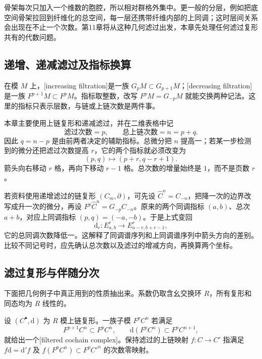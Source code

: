 \ProseParagraphBreak

骨架每次只加入一个维数的胞腔，所以相对群格外集中。更一般的分层，例如把底空间骨架拉回到纤维化的总空间，每一层还携带纤维内部的上同调；这时层间关系会出现在不止一个次数。第11章将从这种几何滤过出发，本章先处理任何滤过复形共有的代数问题。

\subsection{递增、递减滤过及指标换算}
\label{g2:subsec:1001:02}

在模 \(M\) 上，[increasing filtration]是一族 \(G_pM\subset G_{p+1}M\)；[decreasing filtration]是一族 \(F^{p+1}M\subset F^pM\)。指标取整数，改写 \(F^pM=G_{-p}M\) 就能交换两种记法。这里的指标只表示层数，与链或上链次数是两件事。

\ProseParagraphBreak

本章主要使用上链复形和递减滤过，并在二维表格中记
\[
	\text{滤过次数}=p,\qquad\text{总上链次数}=n=p+q.
\]
因此 \(q=n-p\) 是由前两者决定的辅助指标。总微分把 \(n\) 提高一；若某一步检测到的微分还把滤过次数提高 \(r\)，它的两个指标就必须改变为
\begin{equation}\label{g2:eq:spectral-bidegree-convention}
	(p,q)\longmapsto(p+r,q-r+1).
\end{equation}
箭头向右移动 \(r\) 格，再向下移动 \(r-1\) 格。总次数的增量始终是 \(1\)，而不是页数 \(r\)。

\ProseParagraphBreak

若资料使用递增滤过的链复形 \((C_m,\partial)\)，可先设 \(\widehat C^n=C_{-n}\)，把降一次的边界改写成升一次的微分，再设 \(F^p\widehat C^n=G_{-p}C_{-n}\)。原来的两个同调指标 \((a,b)\)、总次 \(a+b\)，对应上同调指标 \((p,q)=(-a,-b)\)。于是上式变回
\[
	\mathrm d_r:E^r_{a,b}\longrightarrow E^r_{a-r,b+r-1},
\]
它的总同调次数降低一。这解释了同调谱序列和上同调谱序列中箭头方向的差别。比较不同记号时，应先确认总次数以及滤过的增减方向，再换算两个坐标。

\subsection{滤过复形与伴随分次}
\label{g2:subsec:1001:03}

下面把几何例子中真正用到的性质抽出来。系数仍取含幺交换环 \(R\)，所有复形和同态均为 \(R\) 线性的。

\begin{definition}[滤过上链复形]\label{g2:def:filtered-cochain-complex}
	设 \((C^\bullet,\mathrm d)\) 为 \(R\) 模上链复形。一族子模 \(F^pC^n\) 若满足
	\[
		F^{p+1}C^n\subset F^pC^n,\qquad
		\mathrm d(F^pC^n)\subset F^pC^{n+1},
	\]
	就给出一个[filtered cochain complex]。保持滤过的上链映射 \(f:C\to C'\) 指满足 \(f\mathrm d=\mathrm d'f\) 及 \(f(F^pC^n)\subset F^pC'^n\) 的次数零映射。
\end{definition}


